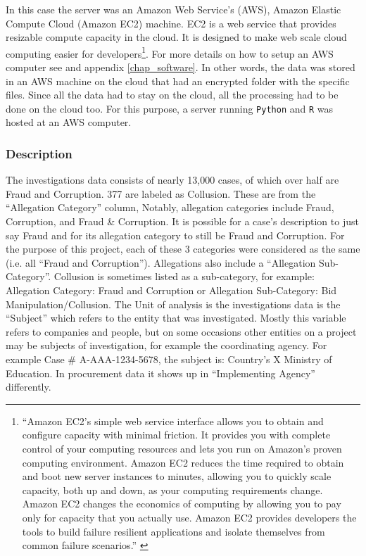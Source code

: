 In this case the server was an Amazon Web Service's (AWS), Amazon Elastic Compute Cloud (Amazon EC2) machine. EC2 is a web service that provides resizable compute capacity in the cloud. It is designed to make web scale cloud computing easier for developers\footnote{``Amazon EC2’s simple web service interface allows you to obtain and configure capacity with minimal friction. It provides you with complete control of your computing resources and lets you run on Amazon’s proven computing environment. Amazon EC2 reduces the time required to obtain and boot new server instances to minutes, allowing you to quickly scale capacity, both up and down, as your computing requirements change. Amazon EC2 changes the economics of computing by allowing you to pay only for capacity that you actually use. Amazon EC2 provides developers the tools to build failure resilient applications and isolate themselves from common failure scenarios.'' \parencite{aws_es2}}. For more details on how to setup an AWS computer see \parencite{aws_start} and appendix \ref{chap_software}. In other words, the data was stored in an AWS machine on the cloud that had an encrypted folder with the specific files. Since all the data had to stay on the cloud, all the processing had to be done on the cloud too. For this purpose, a server running \texttt{Python} and \texttt{R} was hosted at an AWS computer. 


\subsubsection{Description}

The investigations data consists of nearly 13,000 cases, of which over half are Fraud and Corruption. 377 are labeled as Collusion. These are from the ``Allegation Category'' column, Notably, allegation categories include Fraud, Corruption, and Fraud \& Corruption. It is possible for a case's description to just say Fraud and for its allegation category to still be Fraud and Corruption. For the purpose of this project, each of these 3 categories were considered as the same (i.e. all ``Fraud and Corruption''). Allegations also include a ``Allegation Sub-Category''. Collusion is sometimes listed as a sub-category, for example: Allegation Category: Fraud and Corruption or Allegation Sub-Category: Bid Manipulation/Collusion. The Unit of analysis is the investigations data is the ``Subject'' which refers to the entity that was investigated. Mostly this variable refers to companies and people, but on  some occasions other entities on a project may be subjects of investigation, for example the coordinating agency. For example Case \# A-AAA-1234-5678, the subject is: Country's X Ministry of Education. In procurement data it shows up in ``Implementing Agency'' differently.
    
